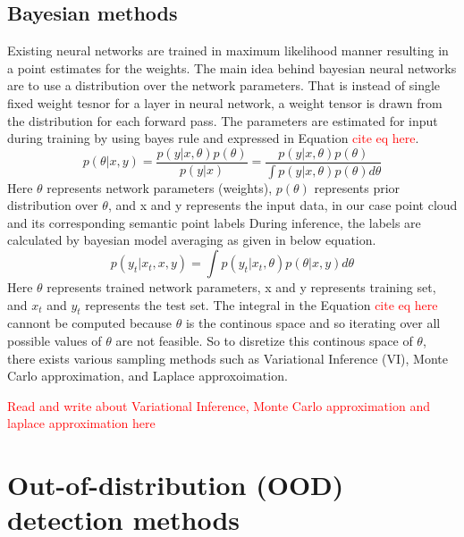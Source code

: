     \subsection{Bayesian methods}
    Existing neural networks are trained in maximum likelihood manner resulting in a point estimates for the weights.
    The main idea behind bayesian neural networks are to use a distribution over the network parameters.
    That is instead of single fixed weight tesnor for a layer in neural network, a weight tensor is drawn from the distribution for each forward pass.
    The parameters are estimated for input during training by using bayes rule and expressed in Equation \textcolor{red}{cite eq here}.
    $$p(\theta|x, y) = \frac{p(y|x, \theta)p(\theta)}{p(y|x)} = \frac{p(y|x, \theta)p(\theta)}{\int p(y|x, \theta) p(\theta) d\theta}$$
    Here $\theta$ represents network parameters (weights), $p(\theta)$ represents prior distribution over $\theta$, and x and y represents the input data, in our case point cloud and its corresponding semantic point labels
    During inference, the labels are calculated by bayesian model averaging as given in below equation.
    $$p(y_t|x_t, x, y) = \int p(y_t|x_t, \theta)p(\theta|x, y)d\theta$$
    Here $\theta$ represents trained network parameters, x and y represents training set, and $x_t$ and $y_t$ represents the test set.
    The integral in the Equation \textcolor{red}{cite eq here} cannont be computed because $\theta$ is the continous space and so iterating over all possible values of $\theta$ are not feasible.
    So to disretize this continous space of $\theta$, there exists various sampling methods such as Variational Inference (VI), Monte Carlo approximation, and Laplace approxoimation.

    \textcolor{red}{Read and write about Variational Inference, Monte Carlo approximation and laplace approximation here}
    \section{Out-of-distribution (OOD) detection methods}


